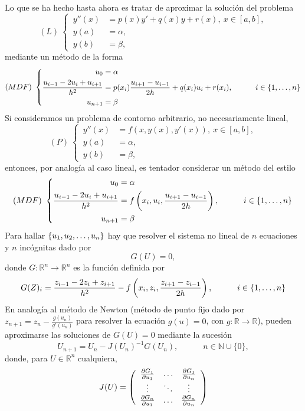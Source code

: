 \documentclass[11pt]{report}
\theoremstyle{mytheorem}
\theoremstyle{mydefinition}
\theoremstyle{myexample}
\newcommand{\R}{\mathbb R}
\newcommand{\N}{\mathbb N}
\begin{document}
Lo que se ha hecho hasta ahora es tratar de aproximar la solución del problema
\[(L) \ \left\{
\begin{alignedat}{1}
\, y''(x)  &= p(x)y'+q(x)y+r(x), \ x \in [a,b], \\
\, y(a) &= \alpha, \\
\, y(b) &= \beta,
\end{alignedat}\right.\]
mediante un método de la forma
\[
(MDF) \ \left\{ \begin{alignedat}{1}
u_0 &= \alpha \\
\frac{u_{i-1}-2u_i+u_{i+1}}{h^2} &= p(x_i)\frac{u_{i+1}-u_{i-1}}{2h}+q(x_i)u_i+r(x_i), \quad \quad \quad i \in \{1,\mathellipsis,n\} \\
u_{n+1} &=\beta
\end{alignedat} \right.
\]
Si consideramos un problema de contorno arbitrario, no necesariamente lineal,
\[(P) \ \left\{
\begin{alignedat}{1}
\, y''(x)  &= f(x,y(x), y'(x)), \ x \in [a,b], \\
\, y(a) &= \alpha, \\
\, y(b) &= \beta,
\end{alignedat}\right.\]
entonces, por analogía al caso lineal, es tentador considerar un método del estilo
\[
(MDF) \ \left\{ \begin{alignedat}{1}
u_0 &= \alpha \\
\frac{u_{i-1}-2u_i+u_{i+1}}{h^2} &= f\left(x_i,u_i,\frac{u_{i+1}-u_{i-1}}{2h}\right), \quad \quad \quad i \in \{1,\mathellipsis,n\} \\
u_{n+1} &=\beta
\end{alignedat} \right.
\]
Para hallar $\{u_1,u_2,\mathellipsis,u_n\}$ hay que resolver el sistema no lineal de $n$ ecuaciones y $n$ incógnitas dado por
\[G(U)=0,\]
donde $G \colon \R^n \to \R^n$ es la función definida por
\[G(Z)_i =\frac{z_{i-1}-2z_i+z_{i+1}}{h^2} - f\left(x_i,z_i,\frac{z_{i+1}-z_{i-1}}{2h}\right), \quad \quad \quad i \in \{1,\mathellipsis,n\}\]
En analogía al método de Newton (método de punto fijo dado por $z_{n+1}=z_n-\frac{g(u_n)}{g'(u_n)}$ para resolver la ecuación $g(u)=0$, con $g \colon \R \to \R$), pueden aproximarse las soluciones de $G(U)=0$ mediante la sucesión
\[U_{n+1} = U_n - J(U_n)^{-1}G(U_n), \quad \quad \quad n \in \N \cup \{0\},\]
donde, para $U \in \R^n$ cualquiera,
\[J(U) = \left(\begin{array}{ccc}
    \frac{\partial G_1}{\partial u_1} & \mathellipsis & \frac{\partial G_1}{\partial u_n} \\
    \vdots & \ddots & \vdots \\
    \frac{\partial G_n}{\partial u_1} & \mathellipsis & \frac{\partial G_n}{\partial u_n}
\end{array}\right)\]
\end{document}

